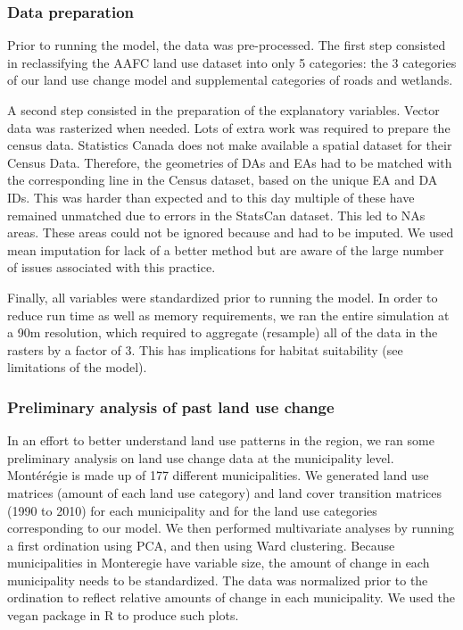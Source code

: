\subsubsection*{Data preparation}
Prior to running the model, the data was pre-processed. The first step consisted in reclassifying the AAFC land use dataset into only 5 categories: the 3 categories of our land use change model and supplemental categories of roads and wetlands.

A second step consisted in the preparation of the explanatory variables. Vector data was rasterized when needed. Lots of extra work was required to prepare the census data. Statistics Canada does not make available a spatial dataset for their Census Data. Therefore, the geometries of DAs and EAs had to be matched with the corresponding line in the Census dataset, based on the unique EA and DA IDs. This was harder than expected and to this day multiple of these have remained unmatched due to errors in the StatsCan dataset. This led to NAs areas. These areas could not be ignored because and had to be imputed. We used mean imputation for lack of a better method but are aware of the large number of issues associated with this practice.

Finally, all variables were standardized prior to running the model. In order to reduce run time as well as memory requirements, we ran the entire simulation at a 90m resolution, which required to aggregate (resample) all of the data in the rasters by a factor of 3. This has implications for habitat suitability (see limitations of the model).\\

\subsubsection{Preliminary analysis of past land use change}
In an effort to better understand land use patterns in the region, we ran some preliminary analysis on land use change data at the municipality level. Montérégie is made up of 177 different municipalities. We generated land use matrices (amount of each land use category) and land cover transition matrices (1990 to 2010) for each municipality and for the land use categories corresponding to our model. We then performed multivariate analyses by running a first ordination using PCA, and then using Ward clustering. Because municipalities in Monteregie have variable size, the amount of change in each municipality needs to be standardized. The data was normalized prior to the ordination to reflect relative amounts of change in each municipality. We used the vegan package in R to produce such plots.\\


